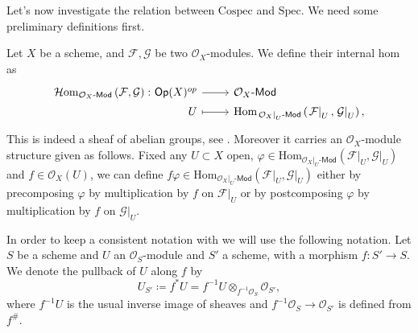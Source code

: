 \documentclass[../Main]{subfiles}
\begin{document}
\noindent
Let's now investigate the relation between $\mathrm{Cospec}$ and $\mathrm{Spec}$.
We need some preliminary definitions first.


\begin{defn}\label{defn:iHomOXMod}
	Let $X$ be a scheme, and $\mathcal{F}, \mathcal{G}$ be two $\mathcal{O}_{ X }$-modules.
	We define their internal hom as
	\begin{equation*}
	\begin{tikzcd}[row sep = 0ex
		,/tikz/column 1/.append style={anchor=base east}
		,/tikz/column 2/.append style={anchor=base west}]
		\mathcal{H}\mathrm{om}_{ \mathcal{O}_{ X }\text{-}\mathsf{Mod} }
		\left( \mathcal{F}, \mathcal{G} \right)\colon 
		\mathsf{Op}(X)^{op} \arrow[r, "", rightarrow] &
		\mathcal{O}_{ X }\text{-}\mathsf{Mod} \\
		U \arrow[r, "", mapsto] & 
		\mathrm{Hom}_{ \left.\mathcal{O}_{ X }\right|_{U}\text{-}\mathsf{Mod} } 
			\left( \left.\mathcal{F}\right|_{U}, \left.\mathcal{G}\right|_{U} \right)
	,\end{tikzcd}
	\end{equation*} 
	This is indeed a sheaf of abelian groups, see 
	\cite[\href{https://stacks.math.columbia.edu/tag/00AK}{Section 00AK}]{SP}.
	Moreover it carries an $\mathcal{O}_{ X }$-module structure given as follows.
	Fixed any $U \subset X$ open, 
	$\varphi \in \mathrm{Hom}_{ \left.\mathcal{O}_{ X }\right|_{U}\text{-}\mathsf{Mod}} 
	\left( \left.\mathcal{F}\right|_{U} , \left.\mathcal{G}\right|_{U} \right)$ and
	$f \in \mathcal{O}_{ X }(U)$, we can define $f \varphi \in
	\mathrm{Hom}_{ \left.\mathcal{O}_{ X }\right|_{U}\text{-}\mathsf{Mod}  } 
	\left( \left.\mathcal{F}\right|_{U} , \left.\mathcal{G}\right|_{U} \right)$
	either by precomposing $\varphi$ by multiplication
	by $f$ on $\left.\mathcal{F}\right|_{U}$ or by postcomposing $\varphi$
	by multiplication by $f$ on $\left.\mathcal{G}\right|_{U}$.
\end{defn}


\begin{ntt}[]
	In order to keep a consistent notation with
	\cite{Messing} we will use the following notation.
	Let $S$ be a scheme and $U$ an $\mathcal{O}_{ S }$-module
	and $S'$ a scheme, with a morphism
	$f\colon S' \to S$.
	We denote the pullback of $U$ along $f$ by 
	\begin{equation*}
	U_{S'} \coloneqq f^*U = 
	f^{-1}U \otimes_{f^{-1}\mathcal{O}_{ S }} \mathcal{O}_{ S' }
	,\end{equation*}
	where $f^{-1} U$ is the usual inverse image of sheaves and
	$f^{-1}\mathcal{O}_{ S } \to \mathcal{O}_{ S' }$ is defined from $f^\#$.
\end{ntt}
\end{document}
